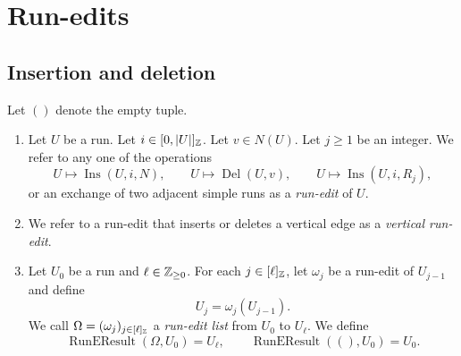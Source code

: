 \section{Run-edits}\label{sec:surgery}
\subsection{Insertion and deletion}
\begin{definition}\label{sync:surgery:2}\leavevmode
Let $()$ denote the empty tuple.
\begin{enumerate}[font=\itshape]
\item Let $U$ be a run. Let $i\in[0,|U|]_{\mathbb Z}$.
Let $v\in N(U)$. Let $j\ge1$ be an integer.
We refer to any one of the operations
\[
 U\mapsto\operatorname{Ins}(U,i,N),\qquad
 U\mapsto\operatorname{Del}(U,v),\qquad
 U\mapsto\operatorname{Ins}(U,i,R_j),
\]
or an exchange of two adjacent simple runs as a \textit{run-edit} of $U$.
\item We refer to a run-edit that inserts or deletes a vertical edge as a
\textit{vertical run-edit}.
\item Let $U_0$ be a run and $\ell\in\mathbb Z_{\ge0}$.
For each $j\in[\ell]_{\mathbb Z}$, let $\omega_j$ be a run-edit of $U_{j-1}$ and define
\[
 U_j=\omega_j(U_{j-1}).
\]
We call $\Omega=(\omega_j)_{j\in[\ell]_{\mathbb Z}}$ a \textit{run-edit list} from $U_0$ to $U_\ell$.
We define
\[
 \operatorname{RunEResult}(\Omega,U_0)=U_\ell,
 \qquad \operatorname{RunEResult}((),U_0)=U_0.
\]
\end{enumerate}
\end{definition}

